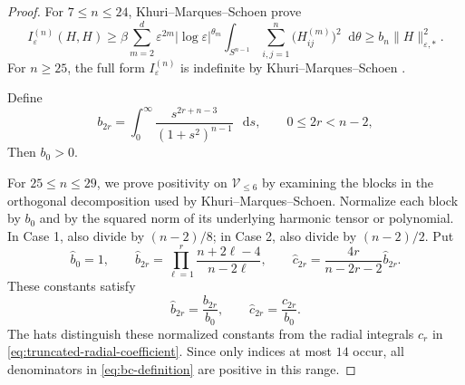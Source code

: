 \documentclass[11pt]{article}
\numberwithin{equation}{section}
\theoremstyle{remark}
\newcommand{\Sph}{S}
\newcommand{\dd}{\mathop{}\!\mathrm{d}}
\begin{document}
\begin{proof}
For $7\le n\le24$, Khuri--Marques--Schoen
\cite[Proposition  A.4]{KMS} prove
 {
\begin{equation*}
 I_\varepsilon^{(n)}(H,H)
 \ge \beta\sum_{m=2}^d
 \varepsilon^{2m}|\log\varepsilon|^{\theta_m}
 \int_{\Sph^{n-1}}\sum_{i,j=1}^n
 \bigl(H_{ij}^{(m)}\bigr)^2\dd\theta \ge b_n\|H\|_{\varepsilon,*}^2.
\end{equation*}
}
For $n\ge25$, the full form
$I_\varepsilon^{(n)}$ is indefinite by Khuri--Marques--Schoen
\cite[Proposition  A.8]{KMS}.

 Define
{
\[
 b_{2r}=\int_0^\infty
 \frac{s^{2r+n-3}}{(1+s^2)^{n-1}}\,\dd s,
 \qquad 0\le2r<n-2,
\]
}
Then $b_0>0$.

For $25\le n\le29$, we prove positivity on
$\mathcal V_{\le6}$ by examining the blocks in the orthogonal decomposition
used by Khuri--Marques--Schoen.  Normalize each block by $b_0$ and by the squared norm
of its underlying harmonic tensor or polynomial.  In Case  1, also divide
by $(n-2)/8$; in Case  2, also divide by $(n-2)/2$.  Put
{
\begin{equation}\label{eq:bc-definition}
 \widehat b_0=1,\qquad
 \widehat b_{2r}=\prod_{\ell=1}^r\frac{n+2\ell-4}{n-2\ell},
 \qquad
 \widehat c_{2r}=\frac{4r}{n-2r-2}\widehat b_{2r}.
\end{equation}
}
These constants satisfy
\[
 \widehat b_{2r}=\frac{b_{2r}}{b_0},\qquad
 \widehat c_{2r}=\frac{c_{2r}}{b_0}.
\]
The hats distinguish these normalized constants from the radial integrals
$c_r$ in \eqref{eq:truncated-radial-coefficient}.  Since only indices at
most $14$ occur, all
denominators in \eqref{eq:bc-definition} are positive in this range.


\end{proof}
\end{document}
